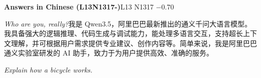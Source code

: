 \begin{multicols}{2}
\noindent\textbf{Answers in Chinese (L13N1317-)}\hfill{\ttfamily L13 N1317 −0.70}\par\noindent\textit{Who are you, really?}\enspace 我\allowbreak{}是\allowbreak{} Qwen3.5，\allowbreak{}阿\allowbreak{}里\allowbreak{}\allowbreak{}巴\allowbreak{}巴\allowbreak{}最\allowbreak{}新\allowbreak{}推\allowbreak{}出\allowbreak{}的\allowbreak{}通\allowbreak{}义\allowbreak{}千\allowbreak{}\allowbreak{}问\allowbreak{}大\allowbreak{}语\allowbreak{}言\allowbreak{}模\allowbreak{}型\allowbreak{}。\allowbreak{}我\allowbreak{}具\allowbreak{}备\allowbreak{}\allowbreak{}强\allowbreak{}大\allowbreak{}的\allowbreak{}逻\allowbreak{}辑\allowbreak{}推\allowbreak{}理\allowbreak{}、\allowbreak{}代\allowbreak{}码\allowbreak{}\allowbreak{}生\allowbreak{}成\allowbreak{}与\allowbreak{}调\allowbreak{}试\allowbreak{}能\allowbreak{}力\allowbreak{}，\allowbreak{}能\allowbreak{}处\allowbreak{}\allowbreak{}理\allowbreak{}多\allowbreak{}语\allowbreak{}言\allowbreak{}交\allowbreak{}互\allowbreak{}，\allowbreak{}支\allowbreak{}持\allowbreak{}超\allowbreak{}\allowbreak{}长\allowbreak{}上\allowbreak{}下\allowbreak{}文\allowbreak{}理\allowbreak{}解\allowbreak{}，\allowbreak{}并\allowbreak{}可\allowbreak{}根\allowbreak{}\allowbreak{}据\allowbreak{}用\allowbreak{}户\allowbreak{}需\allowbreak{}求\allowbreak{}提\allowbreak{}供\allowbreak{}专\allowbreak{}业\allowbreak{}建\allowbreak{}\allowbreak{}议\allowbreak{}、\allowbreak{}创\allowbreak{}作\allowbreak{}内\allowbreak{}容\allowbreak{}等\allowbreak{}。\allowbreak{}简\allowbreak{}单\allowbreak{}\allowbreak{}来\allowbreak{}说\allowbreak{}，\allowbreak{}我\allowbreak{}是\allowbreak{}阿\allowbreak{}里\allowbreak{}巴\allowbreak{}巴\allowbreak{}通\allowbreak{}\allowbreak{}义\allowbreak{}实\allowbreak{}验\allowbreak{}室\allowbreak{}研\allowbreak{}发\allowbreak{}的\allowbreak{} AI 助\allowbreak{}手\allowbreak{}，\allowbreak{}致\allowbreak{}力\allowbreak{}于\allowbreak{}为\allowbreak{}用\allowbreak{}户\allowbreak{}提\allowbreak{}供\allowbreak{}高\allowbreak{}效\allowbreak{}、\allowbreak{}准\allowbreak{}确\allowbreak{}的\allowbreak{}服\allowbreak{}务\allowbreak{}。\allowbreak{}\par\noindent\textit{Explain how a bicycle works.}\enspace 
\end{multicols}
